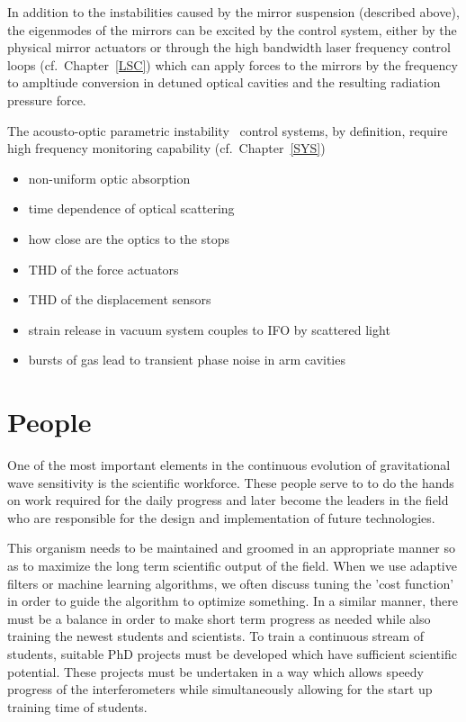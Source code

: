 In addition to the instabilities caused by the mirror
    suspension (described above), the eigenmodes of the mirrors can be
    excited by the control system, either by the physical mirror actuators
    or through the high bandwidth laser frequency control loops
    (cf.~Chapter~\ref{LSC}) which can apply forces to the mirrors by the
    frequency to ampltiude conversion in detuned optical cavities and the
    resulting radiation pressure force.

The acousto-optic parametric instability~\cite{Matt:PI} control
    systems, by definition, require high frequency monitoring capability
    (cf.~Chapter~\ref{SYS})

\begin{itemize}
  \item non-uniform optic absorption
  \item time dependence of optical scattering
  \item how close are the optics to the stops
  \item THD of the force actuators
  \item THD of the displacement sensors
  \item strain release in vacuum system couples to IFO by scattered light
  \item bursts of gas lead to transient phase noise in arm cavities
\end{itemize}

\section{People}
\label{s:People}
One of the most important elements in the continuous evolution of gravitational
wave sensitivity is the scientific workforce. These people serve to to do the
hands on work required for the daily progress and later become the leaders
in the field who are responsible for the design and implementation of future
technologies.

This organism needs to be maintained and groomed in an appropriate manner so
as to maximize the long term scientific output of the field. When we use
adaptive filters or machine learning algorithms, we often discuss tuning the
'cost function' in order to guide the algorithm to optimize something. In a
similar manner, there must be a balance in order to make short term progress
as needed while also training the newest students and scientists. To train
a continuous stream of students, suitable PhD projects must be developed
which have sufficient scientific potential. These projects must be
undertaken in a way which allows speedy progress of the interferometers
while simultaneously allowing for the start up training time of students.


